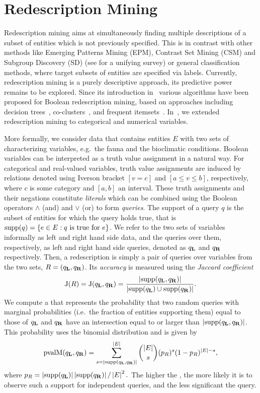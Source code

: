 \section{Redescription Mining}
\label{sec:redescription-mining}

Redescription mining aims at simultaneously finding multiple
descriptions of a subset of entities which is not previously
specified.  This is in contrast with other methods like Emerging
Patterns Mining (EPM), Contrast Set Mining (CSM) and Subgroup
Discovery (SD) (see \cite{kralj09supervised} for a unifying survey) or
general classification methods, where target subsets of entities are
specified via labels.  Currently, redescription mining is a purely
descriptive approach, its predictive power remains to be explored.
Since its introduction in~\cite{ramakrishnan04turning} various
algorithms have been proposed for Boolean redescription mining, based
on approaches including decision
trees~\cite{ramakrishnan04turning,kumar07redescription},
co-clusters~\cite{parida05redescription}, and frequent
itemsets~\cite{gallo08finding}. In~\cite{galbrun11black}, we extended
redescription mining to categorical and numerical variables.

More formally, we consider data that contains entities $E$ with two sets
of characterizing variables, e.g.\ the fauna and the bioclimatic
conditions. 
Boolean variables can be interpreted as a truth value
assignment in a natural way.  For categorical and real-valued
variables, truth value assignments are induced by relations denoted using Iverson bracket $[v=c]$
and $[a \leq v \leq b]$, respectively, where $c$ is some category and
$[a, b]$ an interval.  These truth assignments and their negations
constitute \emph{literals} which can be combined using the Boolean
operators $\land$ (and) and $\lor$ (or) to form \emph{queries}.
The support of a query $q$ is the subset of entities for which
the query holds true, that is 
$\operatorname*{supp}(q) = \{e\in E : q\text{ is true for } e\}$.
We refer to the two sets of variables informally as left and right
hand side data, and the queries over them, respectively, as left and
right hand side queries, denoted as  $q_{\mathbf{L}}$ and  $q_{\mathbf{R}}$ respectively.
Then, a redescription is simply a pair of queries over variables from the
two sets, $R=(q_{\mathbf{L}},q_{\mathbf{R}})$.    
Its \emph{accuracy} is 
measured using the \emph{Jaccard coefficient} 
\[
\jacc(R)= \jacc(q_\iLHS,q_\iRHS) = \frac{\abs{\supp(q_\iLHS,q_\iRHS)}}%
{\abs{\supp(q_\iLHS)\cup\supp(q_\iRHS)}}.
\]
We compute a \pValue{} that represents the probability that two random
queries with marginal probabilities (i.e.\ the fraction of entities
supporting them) equal to those of $q_{\mathbf{L}}$ and $q_{\mathbf{R}}$ have an
intersection equal to or larger than $\abs{\supp(q_\iLHS,
  q_\iRHS)}$. This probability uses the binomial distribution and is given by \[
\text{pvalM}(q_\iLHS, q_\iRHS) = \sum_{s=\abs{\supp(q_\iLHS, q_\iRHS)}}^{\abs{E}} {\abs{E} \choose s} (p_R)^s (1- p_R)^{\abs{E} - s},\]
where $p_R = \abs{\supp(q_\iLHS)}\abs{\supp(q_\iRHS)}/\abs{E}^2.$
The higher the \pValue, the more likely it is to observe such a
support for independent queries, and the less significant the query.

